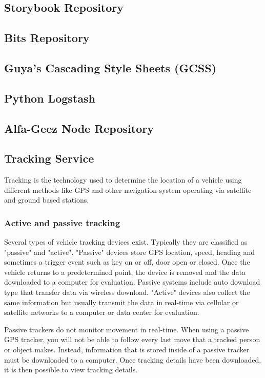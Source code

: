 \subsection{Storybook Repository}
\subsection{Bits Repository}
\subsection{Guya's Cascading Style Sheets (GCSS)}
\subsection{Python Logstash}
\subsection{Alfa-Geez Node Repository}
\subsection{Tracking Service}
Tracking is the technology used to determine the location of a vehicle using different methods like GPS and
other navigation system operating via satellite and ground based stations.

\subsubsection{Active and passive tracking}
Several types of vehicle tracking devices exist. Typically they are classified as "passive" and
"active". "Passive" devices store GPS location, speed, heading and sometimes a trigger event
such as key on or off, door open or closed. Once the vehicle returns to a predetermined point, the
device is removed and the data downloaded to a computer for evaluation. Passive systems
include auto download type that transfer data via wireless download. "Active" devices also
collect the same information but usually transmit the data in real-time via cellular or satellite
networks to a computer or data center for evaluation.

Passive trackers do not monitor movement in real-time. When using a passive GPS tracker, you
will not be able to follow every last move that a tracked person or object makes. Instead,
information that is stored inside of a passive tracker must be downloaded to a computer. Once
tracking details have been downloaded, it is then possible to view tracking details.

